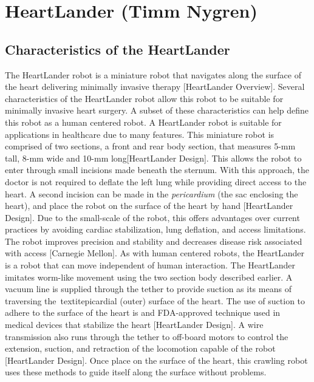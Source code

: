 \documentclass[11pt,conference]{IEEEtran}
\begin{document}
\section{ HeartLander (Timm Nygren)}

\subsection { Characteristics of the HeartLander }
\indent The HeartLander robot is a miniature robot that navigates along the surface of the heart delivering minimally invasive therapy [HeartLander Overview]. Several characteristics of the HeartLander robot allow this robot to be suitable for minimally invasive heart surgery. A subset of these characteristics can help define this robot as a human centered robot. A HeartLander robot is suitable for applications in healthcare due to many features.
\newline
\indent This  miniature robot is comprised of two sections, a front and rear body section, that measures 5-mm tall, 8-mm wide and 10-mm long[HeartLander Design]. This allows the robot to enter through small incisions made beneath the sternum. With this approach, the doctor is not required to deflate the left lung while providing direct access to the heart. A second incision can be made in the \textit{pericardium} (the sac enclosing the heart), and place the robot on the surface of the heart by hand [HeartLander Design]. Due to the small-scale of the robot, this offers advantages over current practices by avoiding cardiac stabilization, lung deflation, and access limitations. The robot improves precision and stability and decreases disease risk associated with access [Carnegie Mellon].
\newline
\indent As with human centered robots, the HeartLander is a robot that can move independent of human interaction. The HeartLander imitates worm-like movement using the two section body described earlier. A vacuum line is supplied through the tether to provide suction as its means of traversing the\ textit{epicardial} (outer) surface of the heart. The use of suction to adhere to the surface of the heart is and FDA-approved technique used in medical devices that stabilize the heart [HeartLander Design]. A wire transmission also runs through the tether to off-board motors to control the extension, suction, and retraction of the locomotion capable of the robot [HeartLander Design]. Once place on the surface of the heart, this crawling robot uses these methods to guide itself along the surface without problems.
\end{document}

